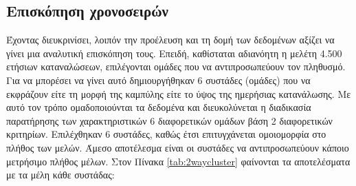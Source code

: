 \subsection{Επισκόπηση χρονοσειρών}
Έχοντας διευκρινίσει, λοιπόν την προέλευση και τη δομή των δεδομένων αξίζει να γίνει μια αναλυτική επισκόπηση τους. Επειδή, καθίσταται αδιανόητη η μελέτη 4.500 ετήσιων καταναλώσεων, επιλέγονται ομάδες που να αντιπροσωπεύουν τον πληθυσμό.  Για να μπορέσει να γίνει αυτό δημιουργήθηκαν 6 συστάδες (ομάδες) που να εκφράζουν είτε τη μορφή της καμπύλης είτε το ύψος της ημερήσιας κατανάλωσης. Με αυτό τον τρόπο ομαδοποιούνται τα δεδομένα και διευκολύνεται η διαδικασία παρατήρησης των χαρακτηριστικών 6 διαφορετικών ομάδων βάση 2 διαφορετικών κριτηρίων. Επιλέχθηκαν 6 συστάδες, καθώς έτσι επιτυγχάνεται ομοιομορφία στο πλήθος των μελών. Άμεσο αποτέλεσμα είναι οι συστάδες να αντιπροσωπεύουν κάποιο μετρήσιμο πλήθος μέλων. Στον Πίνακα \ref{tab:2waycluster} φαίνονται τα αποτελέσματα με τα μέλη κάθε συστάδας:

